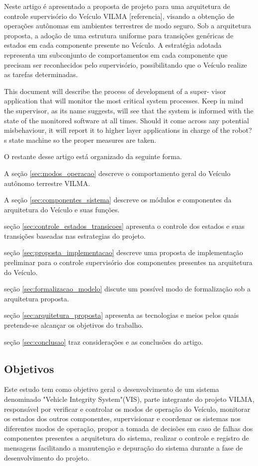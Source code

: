 \documentclass[conference]{IEEEtran}
\begin{document}
Neste artigo é apresentado a proposta de projeto para uma arquitetura de controle supervisório do Veículo VILMA [referencia], visando a obtenção de operações autônomas em ambientes terrestres de modo seguro. Sob a arquitetura proposta, a adoção de uma estrutura uniforme para transições genéricas de estados em cada componente presente no Veículo. A estratégia adotada representa um subconjunto de comportamentos em cada componente que precisam ser reconhecidos pelo supervisório, possibilitando que o Veículo realize as tarefas determinadas.

This document will describe the process of development of a super-
visor application that will monitor the most critical system processes.
Keep in mind the supervisor, as its name suggests, will see that the
system is informed with the state of the monitored software at all
times. Should it come across any potential misbehaviour, it will report
it to higher layer applications in charge of the robot?s state machine so
the proper measures are taken.

O restante desse artigo está organizado da seguinte forma. 

A seção \ref{sec:modos_operacao} descreve o comportamento geral do Veículo autônomo terrestre VILMA. 

A seção \ref{sec:componentes_sistema} descreve os módulos e componentes da arquitetura do Veículo e suas funções. 

seção \ref{sec:controle_estados_transicoes} apresenta o controle dos estados e suas transições baseadas nas estrategias do projeto. 

seção \ref{sec:proposta_implementacao} descreve uma proposta de implementação preliminar para o controle supervisório dos componentes presentes na arquitetura do Veículo. 

seção \ref{sec:formalizacao_modelo} discute um possível modo de formalização sob a arquitetura proposta. 

seção \ref{sec:arquitetura_proposta} apresenta as tecnologias e meios pelos quais pretende-se alcançar os objetivos do trabalho. 

seção \ref{sec:conclusao} traz considerações e as conclusões do artigo.

\subsection{Objetivos}\label{subsec:objectives}

Este estudo tem como objetivo geral o desenvolvimento de um sistema denominado "Vehicle Integrity System"(VIS), parte integrante do projeto VILMA, responsável por verificar e controlar os modos de operação do Veículo, monitorar os estados dos outros componentes, supervisionar e coordenar os sistemas nos diferentes modos de operação, propor a tomada de decisões em caso de falhas dos componentes presentes a arquitetura do sistema, realizar o controle e registro de mensagens facilitando a manutenção e depuração do sistema durante a fase de desenvolvimento do projeto.
\end{document}
